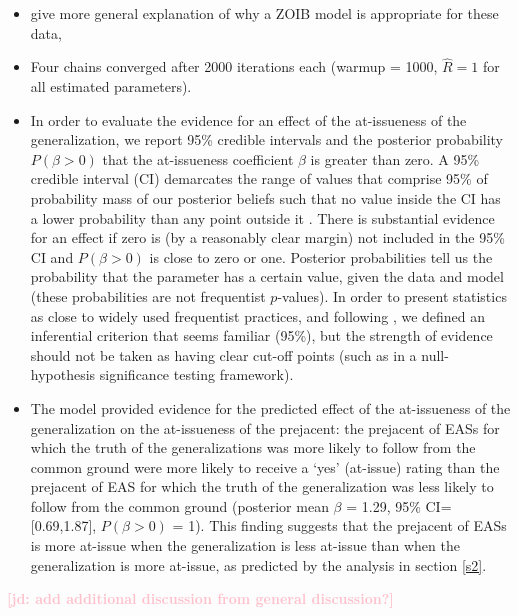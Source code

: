 \documentclass[11pt,fleqn]{article}
\newcommand{\jd}[1]{\textbf{\textcolor{Pink}{[jd: #1]}}}
\newcommand{\6}{\mbox{$[\hspace*{-.6mm}[$}}
\newcommand{\9}{\mbox{$]\hspace*{-.6mm}]$}}
\begin{document}
\begin{itemize}

\item give more general explanation of why a ZOIB model is appropriate for these data, 

\item Four chains converged after 2000 iterations each (warmup = 1000, \(\hat{R}=1\) for all estimated parameters).

\item In order to evaluate the evidence for an effect of the at-issueness of the generalization, we report 95\% credible intervals and the posterior probability $P(\beta > 0)$ that the at-issueness coefficient $\beta$ is greater than zero. A 95\% credible interval (CI) demarcates the range of values that comprise 95\% of probability mass of our posterior beliefs such that no value inside the CI has a lower probability than any point outside it \citep{Jaynes1976, Morey2016}. There is substantial evidence for an effect if zero is (by a reasonably clear margin) not included in the 95\% CI and $P(\beta > 0)$ is close to zero or one. Posterior probabilities tell us the probability that the parameter has a certain value, given the data and model (these probabilities are not frequentist $p$-values). In order to present statistics as close to widely used frequentist practices, and following \citealt{Nicenboim2016}, we defined an inferential criterion that seems familiar (95\%), but the strength of evidence should not be taken as having clear cut-off points (such as in a null-hypothesis significance testing framework).

\item The model provided evidence for the predicted effect of the at-issueness of the generalization on the at-issueness of the prejacent: the prejacent of EASs for which the truth of the generalizations was more likely to follow from the common ground were more likely to receive a `yes' (at-issue) rating than the prejacent of EAS for which the truth of the generalization was less likely to follow from the common ground  (posterior mean $\beta$ = 1.29, 95\% CI={[}0.69,1.87{]}, $P(\beta > 0)$ = 1). This finding suggests that the prejacent of EASs is more at-issue when the generalization is less at-issue than when the generalization is more at-issue, as predicted by the analysis in section \ref{s2}.

\end{itemize}

\jd{add additional discussion from general discussion?}
\end{document}
